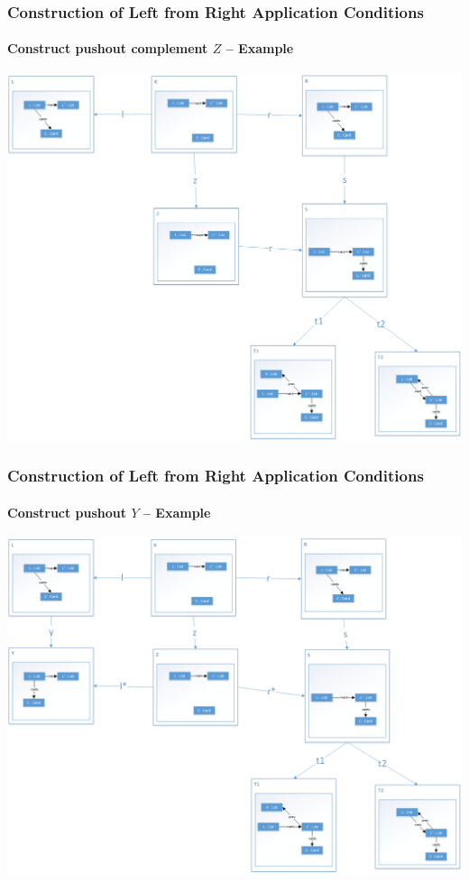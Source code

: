 \documentclass[32pt,t]{beamer}
\begin{document}
	\begin{frame}
		\frametitle{Construction of Left from Right Application Conditions}
		\framesubtitle{Construct pushout complement $Z$ -- Example}
		\centering
		\includegraphics[height=.8\textheight]{Images/52_RightAC-To-LeftAC_Example_Step2}
	\end{frame}

	\begin{frame}
		\frametitle{Construction of Left from Right Application Conditions}
		\framesubtitle{Construct pushout $Y$ -- Example}
		\centering
		\includegraphics[height=.8\textheight]{Images/53_RightAC-To-LeftAC_Example_Step3}
	\end{frame}
\end{document}
